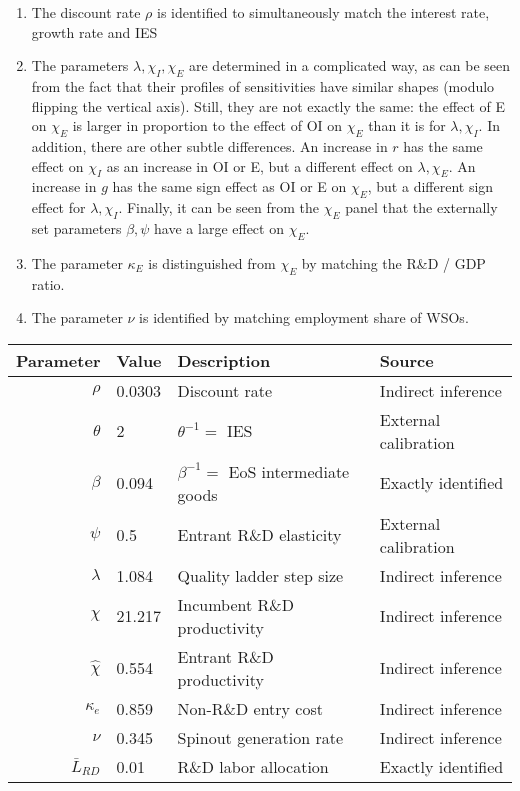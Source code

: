 \documentclass[11pt,english]{article}
\begin{document}
\begin{enumerate}
	\item The discount rate $\rho$ is identified to simultaneously match the interest rate, growth rate and IES
	\item The parameters $\lambda, \chi_I, \chi_E$ are determined in a complicated way, as can be seen from the fact that their profiles of sensitivities have similar shapes (modulo flipping the vertical axis). Still, they are not exactly the same: the effect of E on $\chi_E$ is larger in proportion to the effect of OI on $\chi_E$ than it is for $\lambda, \chi_I$. In addition, there are other subtle differences. An increase in $r$ has the same effect on $\chi_I$ as an increase in OI or E, but a different effect on $\lambda, \chi_E$. An increase in $g$ has the same sign effect as OI or E on $\chi_E$, but a different sign effect for $\lambda, \chi_I$. Finally, it can be seen from the $\chi_E$ panel that the externally set parameters $\beta, \psi$ have a large effect on $\chi_E$.
	\item The parameter $\kappa_E$ is distinguished from $\chi_E$ by matching the R\&D / GDP ratio.
	\item The parameter $\nu$ is identified by matching employment share of WSOs. 
\end{enumerate}

\begin{table}[]
	\centering
	\label{calibration_parameters}
	\begin{tabular}{rlll}
		\toprule \toprule
		Parameter & Value & Description & Source \tabularnewline
		\midrule
		$\rho$ & 0.0303 & Discount rate  & Indirect inference \tabularnewline
		$\theta$ & 2 & $\theta^{-1} = $ IES & External calibration 
		\tabularnewline
		$\beta$ & 0.094 & $\beta^{-1} = $ EoS intermediate goods & Exactly identified \tabularnewline 
		$\psi$ & 0.5 & Entrant R\&D elasticity & External calibration \tabularnewline
		$\lambda$ & 1.084 & Quality ladder step size & Indirect inference 
		\tabularnewline
		$\chi$ & 21.217 & Incumbent R\&D productivity & Indirect inference 
		\tabularnewline
		$\hat{\chi}$ & 0.554 & Entrant R\&D productivity & Indirect inference \tabularnewline 
		$\kappa_e$ & 0.859 & Non-R\&D entry cost & Indirect inference \tabularnewline
		$\nu$ & 0.345 & Spinout generation rate  & Indirect inference\tabularnewline
		$\bar{L}_{RD}$ & 0.01 & R\&D labor allocation  & Exactly identified \tabularnewline
		\bottomrule
	\end{tabular}
\end{table}
\end{document}
